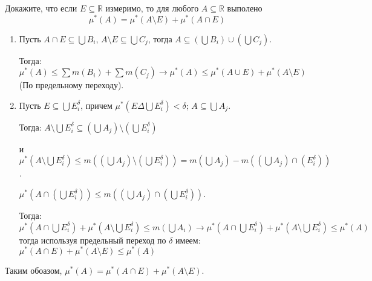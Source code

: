 \begin{task}{4}
Докажите, что если $E \subseteq \mathbb{R}$ измеримо, то для любого $A \subseteq \mathbb{R}$ выполено \[ \mu^*(A) = \mu^*(A \setminus E) + \mu^*(A \cap E) \]
\end{task}

\begin{solution}
\begin{enumerate}
    \item
    Пусть $A \cap E \subseteq \bigcup B_i$, $A \setminus E \subseteq \bigcup C_j$, тогда $A \subseteq \left( \bigcup B_i \right) \cup \left( \bigcup C_j \right)$.
    
    Тогда: $\mu^*(A) \leq \sum m(B_i) + \sum m(C_j) \rightarrow \mu^*(A) \leq \mu^*(A \cup E) + \mu^*(A \setminus E)$ (По предельному переходу).
    
    \item
    Пусть $E \subseteq \bigcup E_i^\delta$, причем $\mu^*(E \Delta \bigcup E_i^\delta) < \delta$; $A \subseteq \bigcup A_j$.
    
    Тогда: $A \setminus \bigcup E_i^\delta \subseteq \left(\bigcup A_j\right) \setminus \left(\bigcup E_i^\delta\right)$
    
    и $\mu^*(A \setminus \bigcup E_i^\delta) \leq m((\bigcup A_j) \setminus (\bigcup E_i^\delta)) = m(\bigcup A_j) - m((\bigcup A_j) \cap (E_i^\delta))$.
    
    $\mu^*(A \cap (\bigcup E_i^\delta)) \leq m((\bigcup A_j) \cap (\bigcup E_i^\delta))$.
    
    Тогда: $\mu^*(A \cap \bigcup E_i^\delta) + \mu^*(A \setminus \bigcup E_i^\delta) \leq m(\bigcup A_i) \rightarrow \mu^*(A \cap \bigcup E_i^\delta) + \mu^*(A \setminus \bigcup E_i^\delta) \leq \mu^*(A)$ тогда используя предельный переход по $\delta$ имеем: $\mu^*(A \cap E) + \mu^*(A \setminus E) \leq \mu^*(A)$
\end{enumerate}

Таким обоазом, $\mu^*(A) = \mu^*(A \cap E) + \mu^*(A \setminus E)$.
\end{solution}